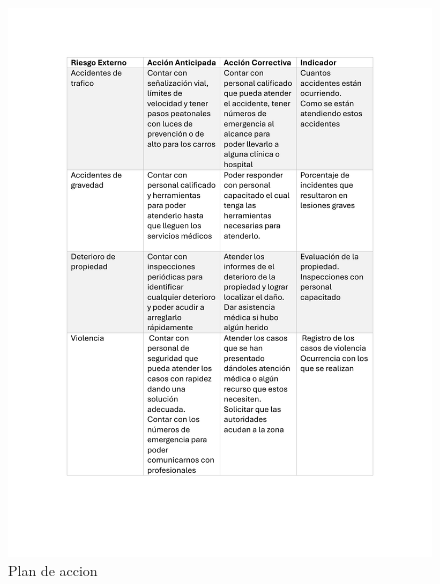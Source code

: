     \begin{figure}[H]
        \centering
        \includegraphics[scale=0.3]{13/img/planDeAccionDos.pdf}
        \caption{Plan de accion}
    \end{figure}
